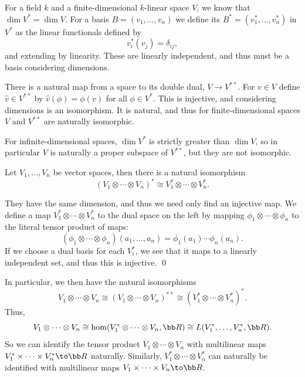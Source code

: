 \enote

\bnote

    For a field $k$ and a finite-dimensional $k$-linear space $V$, we know that $\dim V^*=\dim V$.
    For a basis $B=(v_1,\dots,v_n)$ we define its  $B^*=(v_1^*,\dots,v_n^*)$ in $V^*$ as the linear functionals
    defined by
    $$ v_i^*(v_j) = \delta_{ij} , $$
    and extending by linearity.
    These are linearly independent, and thus must be a basis considering dimensions.

    There is a natural map from a space to its double dual, $V\to V^{**}$.
    For $v\in V$ define $\hat v\in V^{**}$ by $\hat v(\phi)=\phi(v)$ for all $\phi\in V^*$.
    This is injective, and considering dimensions is an isomorphism.
    It is natural, and thus for finite-dimensional spaces $V$ and $V^{**}$ are naturally isomorphic.

    For infinite-dimensional spaces, $\dim V^*$ is strictly greater than $\dim V$, so in particular $V$ is naturally a proper subspace of
    $V^{**}$, but they are not isomorphic.

\enote

\bprop

    Let $V_1,\dots,V_n$ be vector spaces, then there is a natural isomorphism
    $$ (V_1\otimes\cdots\otimes V_n)^* \cong V_1^*\otimes\cdots\otimes V_n^* . $$

\eprop

\bproof

    They have the same dimension, and thus we need only find an injective map.
    We define a map $V_1^*\otimes\cdots\otimes V_n^*$ to the dual space on the left by mapping $\phi_1\otimes\cdots\otimes\phi_n$ to the
    literal tensor product of maps:
    $$ (\phi_1\otimes\cdots\otimes\phi_n)(a_1,\dots,a_n) = \phi_1(a_1)\cdots\phi_n(a_n) . $$
    If we choose a dual basis for each $V_i^*$, we see that it maps to a linearly independent set, and thus this is injective.
    \qed

\eproof

In particular, we then have the natural isomorphisms
$$ V_1\otimes\cdots\otimes V_n \cong (V_1\otimes\cdots\otimes V_n)^{**} \cong (V_1^*\otimes\cdots\otimes V_n^*)^* . $$
Thus,
$$ V_1\otimes\cdots\otimes V_n \cong \hom(V_1^*\otimes\cdots\otimes V_n,\bR) \cong L(V_1^*,\dots,V_n^*,\bR) . $$
So we can identify the tensor product $V_1\otimes\cdots\otimes V_n$ with multilinear maps $V_1^*\times\cdots\times V_n^*\to\bR$ naturally.
Similarly, $V_1^*\otimes\cdots\otimes V_n^*$ can naturally be identified with multilinear maps $V_1\times\cdots\times V_n\to\bR$.

